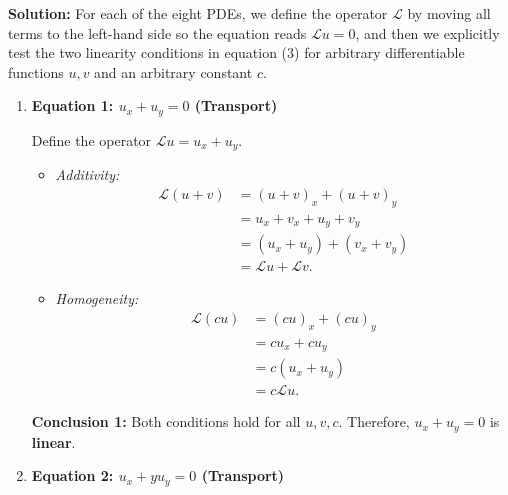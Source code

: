 \documentclass[11pt,a4paper]{article}
\begin{document}
\textbf{Solution:}
For each of the eight PDEs, we define the operator $\mathcal{L}$ by moving all terms to the left-hand side so the equation reads $\mathcal{L}u = 0$, and then we explicitly test the two linearity conditions in equation (3) for arbitrary differentiable functions $u, v$ and an arbitrary constant $c$.

\begin{enumerate}[label=\textbf{\arabic*.}]
    \item \textbf{Equation 1: $u_x + u_y = 0$ (Transport)}
    
    Define the operator $\mathcal{L}u = u_x + u_y$.
    \begin{itemize}
        \item \emph{Additivity:}
        \begin{align*}
            \mathcal{L}(u + v) &= (u + v)_x + (u + v)_y \\
            &= u_x + v_x + u_y + v_y \\
            &= (u_x + u_y) + (v_x + v_y) \\
            &= \mathcal{L}u + \mathcal{L}v.
        \end{align*}
        \item \emph{Homogeneity:}
        \begin{align*}
            \mathcal{L}(cu) &= (cu)_x + (cu)_y \\
            &= cu_x + cu_y \\
            &= c(u_x + u_y) \\
            &= c\mathcal{L}u.
        \end{align*}
    \end{itemize}
    \textbf{Conclusion 1:} Both conditions hold for all $u, v, c$. Therefore, $u_x + u_y = 0$ is \textbf{linear}.

    \item \textbf{Equation 2: $u_x + y u_y = 0$ (Transport)}
    

\end{enumerate}
\end{document}
